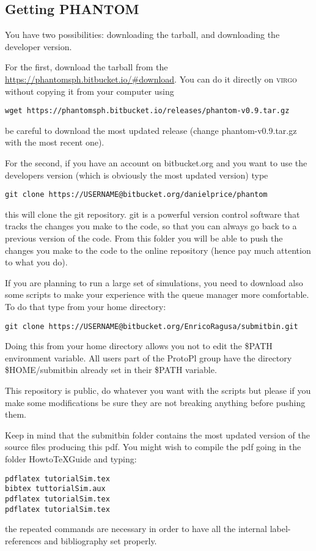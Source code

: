 \documentclass[10pt,a4paper,twoside]{article} %
\begin{document}
\subsection{Getting PHANTOM}\label{getphant}
You have two possibilities: downloading the tarball, and downloading the developer version.

For the first, download the tarball from the \url{https://phantomsph.bitbucket.io/#download}. You can do it directly on \textsc{virgo} without copying it from your computer using 
\begin{verbatim}
wget https://phantomsph.bitbucket.io/releases/phantom-v0.9.tar.gz 
\end{verbatim}
be careful to download the most updated release (change phantom-v0.9.tar.gz with the most recent one).

For the second, if you have an account on bitbucket.org and you want to use the developers version (which is obviously the most updated version) type
\begin{verbatim}
git clone https://USERNAME@bitbucket.org/danielprice/phantom
\end{verbatim}
this will clone the git repository. git is a powerful version control software that tracks the changes you make to the code, so that you can always go back to a previous version of the code. From this folder you will be able to push the changes you make to the code to the online repository (hence pay much attention to what you do).

If you are planning to run a large set of simulations, you need to download also some scripts to make your experience with the queue manager more comfortable. To do that type from your home directory:
\begin{verbatim}
git clone https://USERNAME@bitbucket.org/EnricoRagusa/submitbin.git
\end{verbatim}
Doing this from your home directory allows you not to edit the \$PATH environment variable. All users part of the ProtoPl group have the directory \$HOME/submitbin already set in their \$PATH variable.

This repository is public, do whatever you want with the scripts but please if you make some modifications be sure they are not breaking anything before pushing them.

Keep in mind that the submitbin folder contains the most updated version of the source files producing this pdf. You might wish to compile the pdf going in the folder HowtoTeXGuide and typing:
\begin{verbatim}
pdflatex tutorialSim.tex
bibtex tuttorialSim.aux
pdflatex tutorialSim.tex
pdflatex tutorialSim.tex
\end{verbatim}
the repeated commands are necessary in order to have all the internal label-references and bibliography set properly.
\end{document}
